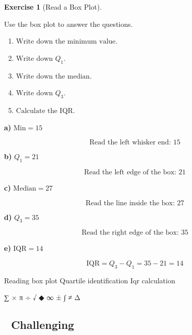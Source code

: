 \documentclass[
  letterpaper,
  DIV=11,
  numbers=noendperiod]{scrreprt}
\theoremstyle{definition}
\newtheorem{exercise}{Exercise}[chapter]
\theoremstyle{remark}
\begin{document}
\begin{exercise}[Read a Box
Plot]\protect\hypertarget{exr-bp-5}{}\label{exr-bp-5}

Use the box plot to answer the questions.

\begin{enumerate}
\def\labelenumi{\alph{enumi})}
\item
  \(\text{Write down the minimum value.}\)
\item
  \(\text{Write down }Q_1.\)
\item
  \(\text{Write down the median.}\)
\item
  \(\text{Write down }Q_3.\)
\item
  \(\text{Calculate the IQR.}\)
\end{enumerate}

\begin{tcolorbox}[enhanced jigsaw, opacitybacktitle=0.6, coltitle=black, arc=.35mm, colframe=quarto-callout-tip-color-frame, colback=white, bottomrule=.15mm, left=2mm, colbacktitle=quarto-callout-tip-color!10!white, titlerule=0mm, opacityback=0, title=\textcolor{quarto-callout-tip-color}{\faLightbulb}\hspace{0.5em}{🔍 View Solution}, leftrule=.75mm, breakable, rightrule=.15mm, bottomtitle=1mm, toptitle=1mm, toprule=.15mm]

\textbf{a)} \(\text{Min} = 15\)

\[\quad \text{Read the left whisker end: }15\]

\textbf{b)} \(Q_1 = 21\)

\[\quad \text{Read the left edge of the box: }21\]

\textbf{c)} \(\text{Median} = 27\)

\[\quad \text{Read the line inside the box: }27\]

\textbf{d)} \(Q_3 = 35\)

\[\quad \text{Read the right edge of the box: }35\]

\textbf{e)} \(\text{IQR} = 14\)

\[\quad \text{IQR} = Q_3 - Q_1 = 35 - 21 = 14\]

\end{tcolorbox}

{Reading box plot} {Quartile identification} {Iqr calculation}

\end{exercise}

∑ × π ÷ √ ◆ ∞ ± ∫ ≠ Δ

\subsection{🔴 Challenging}
\end{document}
